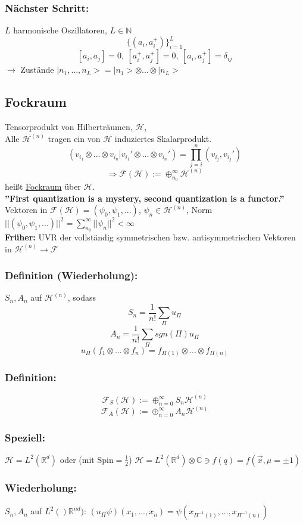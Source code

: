 \documentclass[twoside,a4paper]{scrartcl}
\newcommand{\R}{\mathbb{R}}
\newcommand{\C}{\mathbb{C}}
\renewcommand{\1}{\mathds{1}}
\newcommand{\Ra}{\Rightarrow}
\newcommand{\ra}{\rightarrow}
\renewcommand{\H}{\mathcal{H}}
\newcommand{\F}{\mathcal{F}}
\renewcommand{\R}{\mathbb{R}}
\renewcommand{\C}{\mathbb{C}}
\begin{document}
\subsubsection*{Nächster Schritt:} 
$L$ harmonische Oszillatoren, $L\in \mathbb{N}$
$$\{(a_i,a_i^+)\}^L_{i=1}$$
$$[a_i,a_j]=0, \ [a_i^+,a_j^+]=0, \ [a_i,a_j^+]=\delta_{ij}$$
$\ra$ Zustände $|n_1,...,n_L>=|n_1>\otimes ... \otimes |n_L>$

\subsection{Fockraum} 
Tensorprodukt von Hilberträumen, $\H$,\\
Alle $\H^{(n)}$ tragen ein von $\H$ induziertes Skalarprodukt.
$$(v_{i_1}\otimes ... \otimes v_{i_n}|v_{i_1}'\otimes ... \otimes v_{i_n}')=\prod_{j=i}^n (v_{i_j},v_{i_j}')$$
$$\Ra \F(\H):=\oplus_{n_0}^\infty \H^{(n)}$$
heißt \underline{Fockraum} über $\H$.\\
\textbf{''First quantization is a mystery, second quantization is a functor.''}\\
Vektoren in $\F(\H)=(\psi_0,\psi_1,...)$, $\psi_n\in \H^{(n)}$, Norm $||(\psi_0,\psi_1,...)||^2=\sum_{n_0}^\infty||\psi_n||^2 <\infty$\\
\textbf{Früher:} UVR der vollständig symmetrischen bzw. antisymmetrischen Vektoren in $\H^{(n)} \ra \F$
\subsubsection*{Definition (Wiederholung):} 
$S_n, A_n$ auf $\H^{(n)}$, sodass 
$$S_n=\frac{1}{n!} \sum_\Pi u_\Pi$$
$$A_n=\frac{1}{n!} \sum_\Pi sgn(\Pi) u_\Pi$$
$$u_\Pi(f_1\otimes ... \otimes f_n)=f_{\Pi(1)}\otimes ... \otimes f_{\Pi(n)}$$
\subsubsection*{Definition:} 
$$\F_S(\H):=\oplus_{n=0}^\infty S_n \H^{(n)}$$
$$\F_A(\H):=\oplus_{n=0}^\infty A_n \H^{(n)}$$
\subsubsection*{Speziell:} 
$\H=L^2(\R^d)$ oder (mit Spin$=\frac{1}{2}$) $\H=L^2(\R^d)\otimes\C \ni f(q)=f(\vec x, \mu=\pm 1)$
\subsubsection*{Wiederholung:} 
$S_n,A_n$ auf $L^2()\R^{nd})$: $(u_\Pi\psi)(x_1,...,x_n)=\psi(x_{\Pi^{-1}(1)},...,x_{\Pi^{-1}(n)})$
\end{document}
